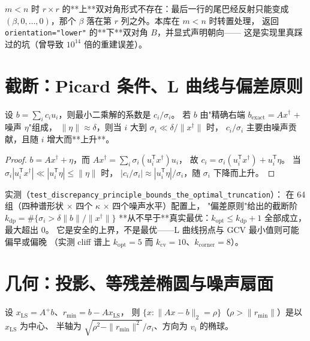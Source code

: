 \begin{remark}[宽矩阵的双对角形式]
$m<n$ 时 $r\times r$ 的**上**双对角形式不存在：最后一行的尾巴经反射只能变成
$(\beta,0,\dots,0)$，那个 $\beta$ 落在第 $r$ 列之外。本库在 $m<n$ 时转置处理，
返回 \texttt{orientation="lower"} 的**下**双对角 $B$，并显式声明朝向——
这是实现里真踩过的坑（曾导致 $10^{14}$ 倍的重建误差）。
\end{remark}

\section{截断：Picard 条件、L 曲线与偏差原则}

\begin{theorem}[Picard 条件]
\label{thm:picard}
设 $b=\sum_ic_iu_i$，则最小二乘解的系数是 $c_i/\sigma_i$。
若 $b$ 由"精确右端 $b_{\text{exact}}=Ax^{\dagger}$ + 噪声 $\eta$"组成，
$\|\eta\|\approx\delta$，则当 $i$ 大到 $\sigma_i\ll\delta/\|x^{\dagger}\|$ 时，
$c_i/\sigma_i$ 主要由噪声贡献，且随 $i$ 增大而**上升**。
\end{theorem}

\begin{proof}
$b=Ax^{\dagger}+\eta$，而 $Ax^{\dagger}=\sum_i\sigma_i(u_i^{\mathsf T}x^{\dagger})u_i$，
故 $c_i=\sigma_i(u_i^{\mathsf T}x^{\dagger})+u_i^{\mathsf T}\eta$。
当 $\sigma_i|u_i^{\mathsf T}x^{\dagger}|\ll|u_i^{\mathsf T}\eta|\le\|\eta\|$ 时，
$|c_i/\sigma_i|\approx|u_i^{\mathsf T}\eta|/\sigma_i$，随 $\sigma_i$ 下降而上升。
\end{proof}

实测（\texttt{test\_discrepancy\_principle\_bounds\_the\_optimal\_truncation}）：
在 64 组（四种谱形状 $\times$ 四个 $\kappa$ $\times$ 四个噪声水平）配置上，
"偏差原则"给出的截断阶 $k_{\text{dp}}=\#\{\sigma_i>\delta\|b\|/\|x^{\dagger}\|\}$
**从不早于**真实最优：$k_{\text{opt}}\le k_{\text{dp}}+1$ 全部成立，最大超出 $0$。
它是安全的上界，不是最优——L 曲线拐点与 GCV 最小值则可能偏早或偏晚
（实测 cliff 谱上 $k_{\text{opt}}=5$ 而 $k_{\text{cv}}=10$、$k_{\text{corner}}=8$）。

\section{几何：投影、等残差椭圆与噪声扇面}

\begin{theorem}[等残差集是椭球]
\label{thm:ellipse}
设 $x_{\mathrm{LS}}=A^{+}b$、$r_{\min}=b-Ax_{\mathrm{LS}}$，
则 $\{x:\|Ax-b\|_2=\rho\}$（$\rho>\|r_{\min}\|$）是以 $x_{\mathrm{LS}}$ 为中心、
半轴为 $\sqrt{\rho^2-\|r_{\min}\|^2}/\sigma_i$、方向为 $v_i$ 的椭球。
\end{theorem}

